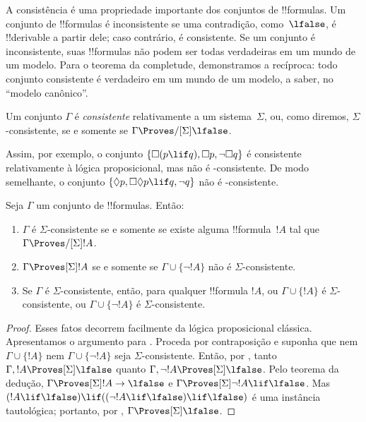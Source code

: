 \documentclass[../../../include/open-logic-section]{subfiles}
\begin{document}


A consistência é uma propriedade importante dos conjuntos de
!!{formula}s. Um conjunto de !!{formula}s é inconsistente se uma
contradição, como~$\lfalse$, é !!{derivable} a partir dele; caso
contrário, é consistente. Se um conjunto é inconsistente, suas
!!{formula}s não podem ser todas verdadeiras em um mundo de um modelo.
Para o teorema da completude, demonstramos a recíproca: todo conjunto
consistente é verdadeiro em um mundo de um modelo, a saber, no
``modelo canônico''.

\begin{defn}
  Um conjunto $\Gamma$ é \emph{consistente} relativamente a um
  sistema~$\Sigma$, ou, como diremos, $\Sigma$-consistente, se e
  somente se $\Gamma
  \Proves/[\Sigma] \lfalse$.
\end{defn}

Assim, por exemplo, o conjunto $\{ \Box(p \lif q), \Box p,
\lnot\Box q \}$ é consistente relativamente à lógica proposicional,
mas não é -consistente. De modo semelhante, o conjunto
$\{ \Diamond p, \Box\Diamond p \lif q, \lnot q \}$ não é
-consistente.

\begin{prop}
  Seja $\Gamma$ um conjunto de !!{formula}s. Então:
  \begin{enumerate}
  \item $\Gamma$ é $\Sigma$-consistente se e somente se existe
    alguma !!{formula}~$!A$ tal que $\Gamma \Proves/[\Sigma]
    !A$.
  \item {}%
    $\Gamma \Proves[\Sigma] !A$ se e somente se $\Gamma \cup \{
    \lnot!A \}$ não é $\Sigma$-consistente.
  \item {}%
    Se $\Gamma$ é $\Sigma$-consistente, então, para qualquer
    !!{formula} $!A$, ou $\Gamma \cup \{ !A \}$ é
    $\Sigma$-consistente, ou $\Gamma \cup \{ \lnot!A \}$ é
    $\Sigma$-consistente.
  \end{enumerate}
\end{prop}

\begin{proof}
  Esses fatos decorrem facilmente da lógica proposicional clássica.
  Apresentamos o argumento para .
  Proceda por contraposição e suponha que nem $\Gamma \cup \{ !A \}$
  nem $\Gamma \cup \{ \lnot!A \}$ seja $\Sigma$-consistente. Então,
  por , tanto
  $\Gamma, !A \Proves[\Sigma] \lfalse$ quanto
  $\Gamma, \lnot !A \Proves[\Sigma] \lfalse$. Pelo teorema da dedução,
  $\Gamma \Proves[\Sigma] !A \to \lfalse$ e
  $\Gamma \Proves[\Sigma] \lnot!A \lif \lfalse$. Mas $(!A \lif
  \lfalse) \lif ((\lnot!A \lif \lfalse) \lif \lfalse)$ é uma
  instância tautológica; portanto, por
  ,
  $\Gamma \Proves[\Sigma] \lfalse$.
\end{proof}
\end{document}
